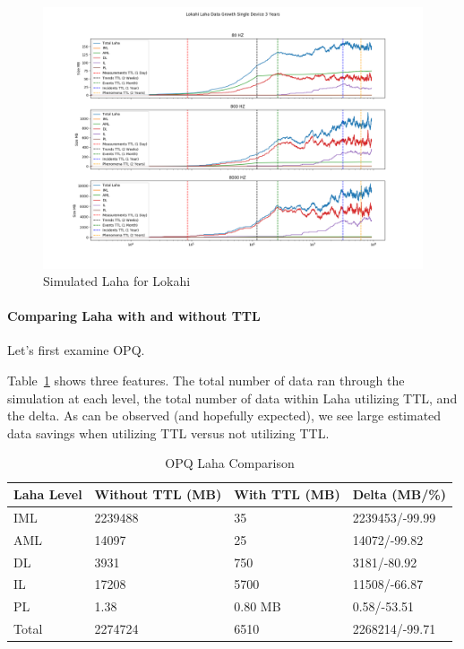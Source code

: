 \begin{figure}[H]
	\centering
	\includegraphics[width=\linewidth]{figures/sim_laha_lokahi.png}
	\caption{Simulated Laha for Lokahi}
	\label{fig:sim_laha_lokahi}
\end{figure}

\paragraph{Comparing Laha with and without TTL}

Let's first examine OPQ\@.

Table~\ref{table:opq_laha_comparison} shows three features. The total number of data ran through the simulation at each level, the total number of data within Laha utilizing TTL, and the delta. As can be observed (and hopefully expected), we see large estimated data savings when utilizing TTL versus not utilizing TTL\@.

\begin{table}[H]
	\centering
	\caption{OPQ Laha Comparison}
	\begin{tabularx}{\textwidth}{Xlll}
		\toprule
		\textbf{Laha Level} & \textbf{Without TTL (MB)} & \textbf{With TTL (MB)} & \textbf{Delta (MB/\%)} \\
		\midrule
		IML & 2239488 & 35 & 2239453/-99.99 \\
		AML & 14097 & 25 & 14072/-99.82\\
		DL & 3931 & 750 & 3181/-80.92 \\
		IL & 17208 & 5700 & 11508/-66.87 \\
		PL & 1.38 & 0.80 MB & 0.58/-53.51 \\
		Total & 2274724 & 6510 & 2268214/-99.71 \\
		\bottomrule
	\end{tabularx}
	\label{table:opq_laha_comparison}
\end{table}

